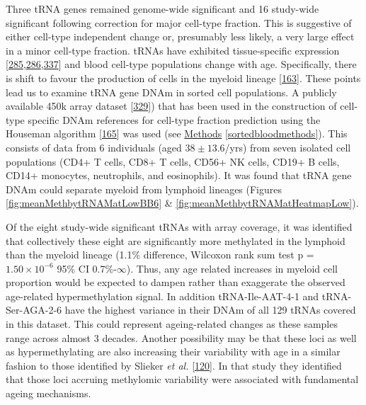 \documentclass[
]{book}
\begin{document}
Three tRNA genes remained genome-wide significant and 16 study-wide significant following correction for major cell-type fraction.
This is suggestive of either cell-type independent change or, presumably less likely, a very large effect in a minor cell-type fraction.
tRNAs have exhibited tissue-specific expression {[}\protect\hyperlink{ref-Dittmar2006}{285},\protect\hyperlink{ref-Sagi2016}{286},\protect\hyperlink{ref-Schmitt2014b}{337}{]} and blood cell-type populations change with age.
Specifically, there is shift to favour the production of cells in the myeloid lineage {[}\protect\hyperlink{ref-Geiger2013}{163}{]}.
These points lead us to examine tRNA gene DNAm in sorted cell populations.
A publicly available 450k array dataset {[}\protect\hyperlink{ref-Reinius2012}{329}{]}) that has been used in the construction of cell-type specific DNAm references for cell-type fraction prediction using the Houseman algorithm {[}\protect\hyperlink{ref-Houseman2012}{165}{]} was used (see \protect\hyperlink{sortedbloodmethods}{Methods} \ref{sortedbloodmethods}).
This consists of data from 6 individuals (aged \(38 \pm 13.6\)/yrs) from seven isolated cell populations (CD4+ T cells, CD8+ T cells, CD56+ NK cells, CD19+ B cells, CD14+ monocytes, neutrophils, and eosinophils).
It was found that tRNA gene DNAm could separate myeloid from lymphoid lineages (Figures \ref{fig:meanMethbytRNAMatLowBB6} \& \ref{fig:meanMethbytRNAMatHeatmapLow}).

Of the eight study-wide significant tRNAs with array coverage, it was identified that collectively these eight are significantly more methylated in the lymphoid than the myeloid lineage (1.1\% difference, Wilcoxon rank sum test p = \(1.50\times10^{-6}\) 95\% CI 0.7\%-\(\infty\)).
Thus, any age related increases in myeloid cell proportion would be expected to dampen rather than exaggerate the observed age-related hypermethylation signal.
In addition tRNA-Ile-AAT-4-1 and tRNA-Ser-AGA-2-6 have the highest variance in their DNAm of all 129 tRNAs covered in this dataset.
This could represent ageing-related changes as these samples range across almost 3 decades.
Another possibility may be that these loci as well as hypermethylating are also increasing their variability with age in a similar fashion to those identified by Slieker \emph{et al.} {[}\protect\hyperlink{ref-Slieker2016}{120}{]}.
In that study they identified that those loci accruing methylomic variability were associated with fundamental ageing mechanisms.
\end{document}
